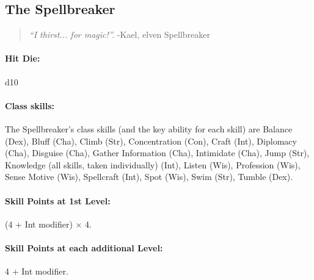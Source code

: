 \subsection[Spellbreaker]{The Spellbreaker}
\label{sec:Spellbreaker}
\begin{quote}
\emph{``I thirst... for magic!''.}
-Kael, elven Spellbreaker
\end{quote}

\paragraph{Hit Die:} d10
\paragraph{Class skills:}
The Spellbreaker's class skills (and the key ability for each skill) are Balance (Dex), Bluff (Cha), Climb (Str), Concentration (Con), Craft (Int), Diplomacy (Cha), Disguise (Cha), Gather Information (Cha), Intimidate (Cha), Jump (Str), Knowledge (all skills, taken individually) (Int), Listen (Wis), Profession (Wis), Sense Motive (Wis), Spellcraft (Int), Spot (Wis), Swim (Str), Tumble (Dex).

\paragraph{Skill Points at 1st Level:} (4 + Int modifier) $\times$ 4.
\paragraph{Skill Points at each additional Level:} 4 + Int modifier.


